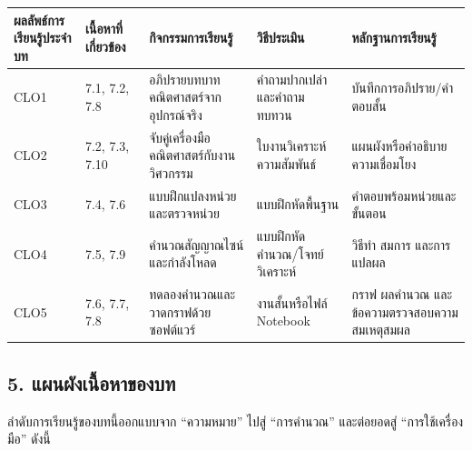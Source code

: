 \begin{table}[htbp]
    \centering
    \begin{tabular}{l l l l l}
        \hline
        \textbf{ผลลัพธ์การเรียนรู้ประจำบท} & \textbf{เนื้อหาที่เกี่ยวข้อง} & \textbf{กิจกรรมการเรียนรู้} & \textbf{วิธีประเมิน} & \textbf{หลักฐานการเรียนรู้} \\
        \hline
        CLO1 & 7.1, 7.2, 7.8 & อภิปรายบทบาทคณิตศาสตร์จากอุปกรณ์จริง & คำถามปากเปล่าและคำถามทบทวน & บันทึกการอภิปราย/คำตอบสั้น \\
        CLO2 & 7.2, 7.3, 7.10 & จับคู่เครื่องมือคณิตศาสตร์กับงานวิศวกรรม & ใบงานวิเคราะห์ความสัมพันธ์ & แผนผังหรือคำอธิบายความเชื่อมโยง \\
        CLO3 & 7.4, 7.6 & แบบฝึกแปลงหน่วยและตรวจหน่วย & แบบฝึกหัดพื้นฐาน & คำตอบพร้อมหน่วยและขั้นตอน \\
        CLO4 & 7.5, 7.9 & คำนวณสัญญาณไซน์และกำลังโหลด & แบบฝึกหัดคำนวณ/โจทย์วิเคราะห์ & วิธีทำ สมการ และการแปลผล \\
        CLO5 & 7.6, 7.7, 7.8 & ทดลองคำนวณและวาดกราฟด้วยซอฟต์แวร์ & งานสั้นหรือไฟล์ Notebook & กราฟ ผลคำนวณ และข้อความตรวจสอบความสมเหตุสมผล \\
        \hline
    \end{tabular}
\end{table}

\subsection{5. แผนผังเนื้อหาของบท}

ลำดับการเรียนรู้ของบทนี้ออกแบบจาก “ความหมาย” ไปสู่ “การคำนวณ” และต่อยอดสู่ “การใช้เครื่องมือ” ดังนี้

